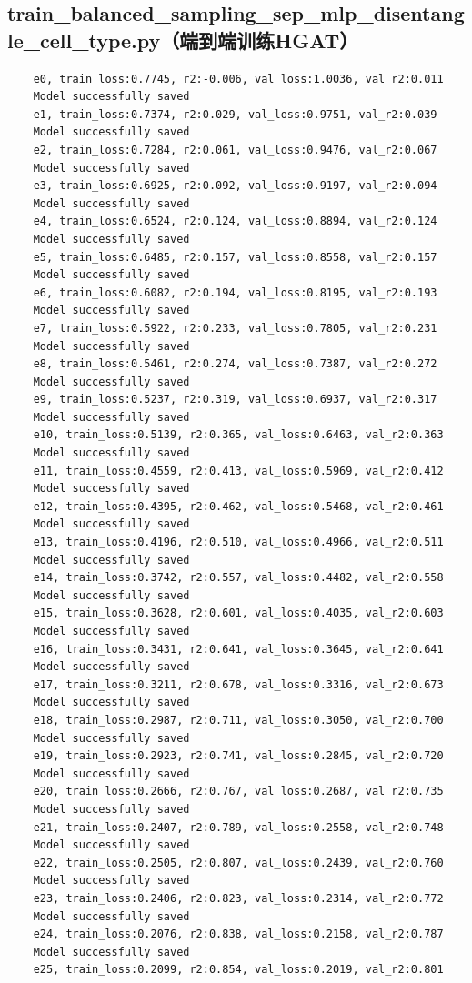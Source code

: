 \documentclass[a4paper, 12pt]{article}
\begin{document}
		\subsection{train\_balanced\_sampling\_sep\_mlp\_disentangle\_cell\_type.py（端到端训练HGAT）}		
	\begin{lstlisting}	
	e0, train_loss:0.7745, r2:-0.006, val_loss:1.0036, val_r2:0.011
	Model successfully saved
	e1, train_loss:0.7374, r2:0.029, val_loss:0.9751, val_r2:0.039
	Model successfully saved
	e2, train_loss:0.7284, r2:0.061, val_loss:0.9476, val_r2:0.067
	Model successfully saved
	e3, train_loss:0.6925, r2:0.092, val_loss:0.9197, val_r2:0.094
	Model successfully saved
	e4, train_loss:0.6524, r2:0.124, val_loss:0.8894, val_r2:0.124
	Model successfully saved
	e5, train_loss:0.6485, r2:0.157, val_loss:0.8558, val_r2:0.157
	Model successfully saved
	e6, train_loss:0.6082, r2:0.194, val_loss:0.8195, val_r2:0.193
	Model successfully saved
	e7, train_loss:0.5922, r2:0.233, val_loss:0.7805, val_r2:0.231
	Model successfully saved
	e8, train_loss:0.5461, r2:0.274, val_loss:0.7387, val_r2:0.272
	Model successfully saved
	e9, train_loss:0.5237, r2:0.319, val_loss:0.6937, val_r2:0.317
	Model successfully saved
	e10, train_loss:0.5139, r2:0.365, val_loss:0.6463, val_r2:0.363
	Model successfully saved
	e11, train_loss:0.4559, r2:0.413, val_loss:0.5969, val_r2:0.412
	Model successfully saved
	e12, train_loss:0.4395, r2:0.462, val_loss:0.5468, val_r2:0.461
	Model successfully saved
	e13, train_loss:0.4196, r2:0.510, val_loss:0.4966, val_r2:0.511
	Model successfully saved
	e14, train_loss:0.3742, r2:0.557, val_loss:0.4482, val_r2:0.558
	Model successfully saved
	e15, train_loss:0.3628, r2:0.601, val_loss:0.4035, val_r2:0.603
	Model successfully saved
	e16, train_loss:0.3431, r2:0.641, val_loss:0.3645, val_r2:0.641
	Model successfully saved
	e17, train_loss:0.3211, r2:0.678, val_loss:0.3316, val_r2:0.673
	Model successfully saved
	e18, train_loss:0.2987, r2:0.711, val_loss:0.3050, val_r2:0.700
	Model successfully saved
	e19, train_loss:0.2923, r2:0.741, val_loss:0.2845, val_r2:0.720
	Model successfully saved
	e20, train_loss:0.2666, r2:0.767, val_loss:0.2687, val_r2:0.735
	Model successfully saved
	e21, train_loss:0.2407, r2:0.789, val_loss:0.2558, val_r2:0.748
	Model successfully saved
	e22, train_loss:0.2505, r2:0.807, val_loss:0.2439, val_r2:0.760
	Model successfully saved
	e23, train_loss:0.2406, r2:0.823, val_loss:0.2314, val_r2:0.772
	Model successfully saved
	e24, train_loss:0.2076, r2:0.838, val_loss:0.2158, val_r2:0.787
	Model successfully saved
	e25, train_loss:0.2099, r2:0.854, val_loss:0.2019, val_r2:0.801

\end{lstlisting}
\end{document}
